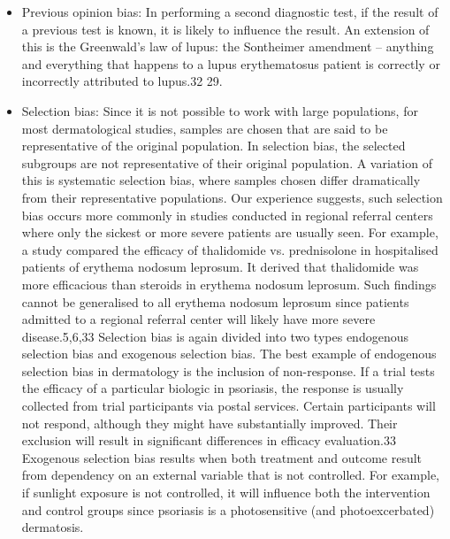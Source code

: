 \documentclass[12pt, a4paper, oneside]{book}   	%
\begin{document}
\begin{itemize}
				\autocite{Chakraborty_2023}
				\item  Previous opinion bias: In performing a second diagnostic test, if the result of a previous test is known, it is likely to influence the result. An extension of this is the Greenwald’s law of lupus: the Sontheimer amendment – anything and everything that happens to a lupus erythematosus patient is correctly or incorrectly attributed to lupus.32 29. \autocite{Chakraborty_2023}
				\item Selection bias: Since it is not possible to work with large populations, for most dermatological studies, samples are chosen that are said to be representative of the original population. In selection bias, the selected subgroups are not representative of their original population. A variation of this is systematic selection bias, where samples chosen differ dramatically from their representative populations. Our experience suggests, such selection bias occurs more commonly in studies conducted in regional referral centers where only the sickest or more severe patients are usually seen. For example, a study compared the efficacy of thalidomide vs. prednisolone in hospitalised patients of erythema nodosum leprosum. It derived that thalidomide was more efficacious than steroids in erythema nodosum leprosum. Such findings cannot be generalised to all erythema nodosum leprosum since patients admitted to a regional referral center will likely have more severe disease.5,6,33 Selection bias is again divided into two types endogenous selection bias and exogenous selection bias. The best example of endogenous selection bias in dermatology is the inclusion of non-response. If a trial tests the efficacy of a particular biologic in psoriasis, the response is usually collected from trial participants via postal services. Certain participants will not respond, although they might have substantially improved. Their exclusion will result in significant differences in efficacy evaluation.33 Exogenous selection bias results when both treatment and outcome result from dependency on an external variable that is not controlled. For example, if sunlight exposure is not controlled, it will influence both the intervention and control groups since psoriasis is a photosensitive (and photoexcerbated) dermatosis.
				

\end{itemize}
\end{document}
